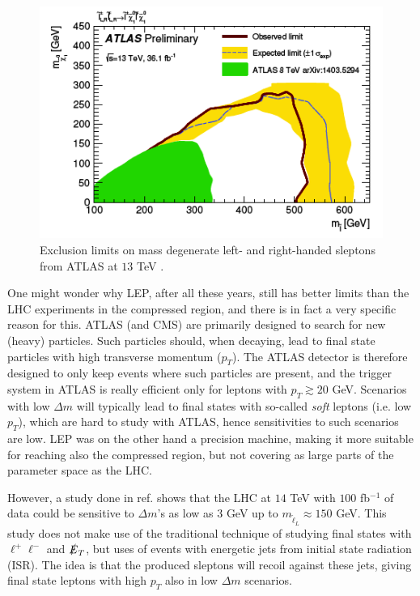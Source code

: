 \documentclass[twocolumn,a4paper,10pt]{article}
\begin{document}
\begin{figure}
\begin{center}
\includegraphics[scale=0.5]{Run2exclusion_new.png}
\caption{Exclusion limits on mass degenerate left- and right-handed sleptons from ATLAS at $13$ TeV 
\cite{ATLAS:2017}.}
\label{fig:ATLAS 13TeV}
\end{center}
\end{figure}

One might wonder why LEP, after all these years, still has better limits than the LHC experiments in the 
compressed region, and there is in fact a very specific reason for this. ATLAS (and CMS) are primarily 
designed 
to search for new (heavy) particles. Such particles should, when decaying, lead to final state particles 
with high transverse momentum ($p_T$). The ATLAS detector is therefore designed to only keep events where 
such particles are present, and the trigger system \cite{ATLAS triggers} in ATLAS is really efficient 
only for leptons with $p_T \gtrsim 20$ GeV. Scenarios with low $\Delta m$ will typically lead to final 
states with so-called \textit{soft} leptons (i.e. low $p_T$), which are hard to study with ATLAS, hence 
sensitivities to such scenarios are low. LEP was on the other hand a precision machine, making it more 
suitable for reaching also the compressed region, but not covering as large parts of the parameter 
space as the LHC. 

However, a study done in ref. \cite{Compressed sleptons} shows that the LHC at $14$ TeV with $100$ 
fb$^{-1}$ of data could be sensitive to $\Delta m$'s as low as $3$ GeV up to 
$m_{\tilde{\ell}_L} \approx 150$ GeV. This study does not make use of the traditional 
technique of studying final states with $\ell^+ \ell^-$ and $\slashed{E}_T$, but uses of events with 
energetic jets from initial state radiation (ISR). The idea is that the produced sleptons will recoil 
against these jets, giving final state leptons with high $p_T$ also in low $\Delta m$ scenarios.        
\end{document}
